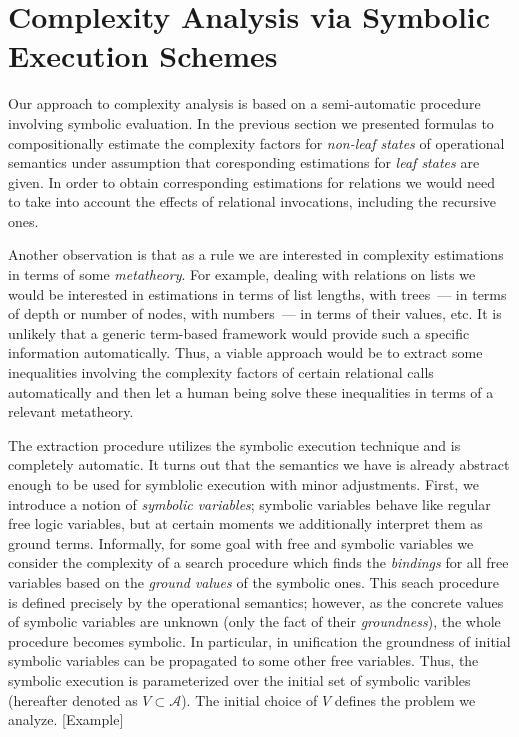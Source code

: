 \section{Complexity Analysis via Symbolic Execution Schemes}
\label{sec:symbolic}

Our approach to complexity analysis is based on a semi-automatic procedure involving symbolic evaluation.
In the previous section we presented formulas to compositionally estimate the complexity factors for
\emph{non-leaf states} of operational semantics under assumption that coresponding estimations for
\emph{leaf states} are given. In order to obtain corresponding estimations for relations we
would need to take into account the effects of relational invocations, including the recursive ones.

Another observation is that as a rule we are interested in complexity estimations in terms of some \emph{metatheory}. For
example, dealing with relations on lists we would be interested in estimations in terms of list lengths,
with trees~--- in terms of depth or number of nodes, with numbers~--- in terms of their values, etc. It is
unlikely that a generic term-based framework would provide such a specific information automatically. Thus,
a viable approach would be to extract some inequalities involving the complexity factors of certain relational
calls automatically and then let a human being solve these inequalities in terms of a relevant metatheory.

The extraction procedure utilizes the symbolic execution technique and is completely automatic. It turns out that
the semantics we have is already abstract enough to be used for symblolic execution with minor adjustments.
First, we introduce a notion of \emph{symbolic variables}; symbolic variables behave like regular free logic
variables, but at certain moments we additionally interpret them as ground terms. Informally, for some
goal with free and symbolic variables we consider the complexity of a search procedure which finds
the \emph{bindings} for all free variables based on the \emph{ground values} of the symbolic ones. This
seach procedure is defined precisely by the operational semantics; however, as the concrete values of symbolic
variables are unknown (only the fact of their \emph{groundness}), the whole procedure becomes symbolic. In particular,
in unification the groundness of initial symbolic variables can be propagated to some other free variables. Thus,
the symbolic execution is parameterized over the initial set of symbolic varibles (hereafter denoted as $V\subset\mathcal A$).
The initial choice of $V$ defines the problem we analyze. [Example]




